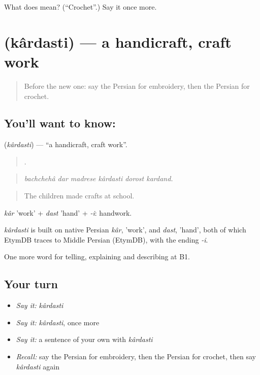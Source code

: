 \begin{tcolorbox}[breakable,colback=teal!4,colframe=teal!35!black,title={Before you move on}]
What does   mean? (\textquotedblleft{}Crochet\textquotedblright{}.) Say it once more.
\end{tcolorbox}
\section[\texorpdfstring{\fa{کاردستی} (kârdasti)}{کاردستی (kârdasti)}]{ (kârdasti) — a handicraft, craft work}

\label{lesson:FA-C508-kardasti}



\begin{quote}
Before the new one: say the Persian for embroidery, then the Persian for crochet.
\end{quote}

\subsection*{You'll want to know: }
\textbf{} (\emph{kârdasti}) — \textquotedblleft{}a handicraft, craft work\textquotedblright{}.

\begin{quote}
      .
\end{quote}

\begin{quote}
\emph{bachchehâ dar madrese kârdasti dorost kardand.}
\end{quote}

\begin{quote}
The children made crafts at school.
\end{quote}

\emph{kâr} 'work' + \emph{dast} 'hand' + \emph{-i}: handwork.

\begin{cousinweb}
\emph{kârdasti} is built on native Persian \emph{kâr}, 'work', and \emph{dast}, 'hand', both of which EtymDB traces to Middle Persian (EtymDB), with the ending \emph{-i}.
\end{cousinweb}

\begin{grammarlens}[title={What you've built}]
One more word for telling, explaining and describing at B1.
\end{grammarlens}

\subsection*{Your turn}
\begin{itemize}
\raggedright
  \item \emph{Say it:} \emph{kârdasti}
  \item \emph{Say it:} \emph{kârdasti}, once more
  \item \emph{Say it:} a sentence of your own with \emph{kârdasti}
  \item \emph{Recall:} say the Persian for embroidery, then the Persian for crochet, then say \emph{kârdasti} again
\end{itemize}

